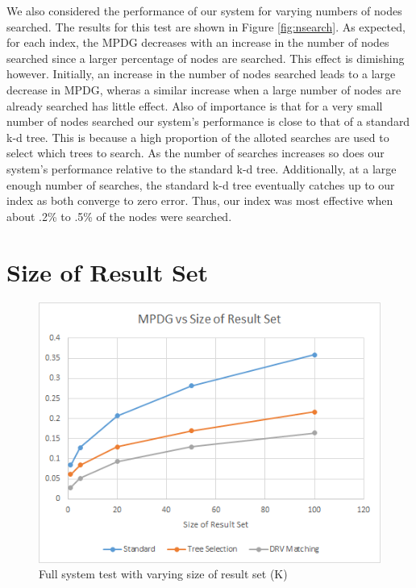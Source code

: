 We also considered the performance of our system for varying numbers of nodes searched.  The results for this test are shown in Figure \ref{fig:nsearch}.  As expected, for each index, the MPDG decreases with an increase in the number of nodes searched since a larger percentage of nodes are searched.  This effect is dimishing however.  Initially, an increase in the number of nodes searched leads to a large decrease in MPDG, wheras a similar increase when a large number of nodes are already searched has little effect.  Also of importance is that for a very small number of nodes searched our system's performance is close to that of a standard k-d tree.  This is because a high proportion of the alloted searches are used to select which trees to search.  As the number of searches increases so does our system's performance relative to the standard k-d tree.  Additionally, at a large enough number of searches, the standard k-d tree eventually catches up to our index as both converge to zero error.  Thus, our index was most effective when about .2\% to .5\% of the nodes were searched.

\section{Size of Result Set}

\begin{figure}[h]
\begin{center}
\includegraphics[width=.85\textwidth]{Figures/k}
\end{center}
\caption{Full system test with varying size of result set (K)}
\label{fig:kparam}
\end{figure}

